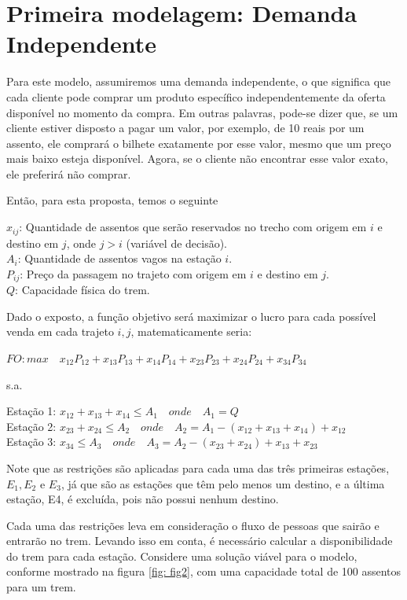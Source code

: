 \section{Primeira modelagem: Demanda Independente}\label{sec:modelo1}

Para este modelo, assumiremos uma demanda independente, o que significa que cada cliente pode comprar um produto específico independentemente da oferta disponível no momento da compra. Em outras palavras, pode-se dizer que, se um cliente estiver disposto a pagar um valor, por exemplo, de 10 reais por um assento, ele comprará o bilhete exatamente por esse valor, mesmo que um preço mais baixo esteja disponível. Agora, se o cliente não encontrar esse valor exato, ele preferirá não comprar.

Então, para esta proposta, temos o seguinte

\noindent $x_{ij}$: Quantidade de assentos que serão reservados no trecho com origem em $i$ e destino em $j$, onde $j>i$ (variável de decisão). \\
\noindent $A_i$: Quantidade de assentos vagos na estação $i$. \\
\noindent $P_{ij}$: Preço da passagem no trajeto com origem em $i$ e destino em $j$. \\
\noindent $Q$: Capacidade física do trem.

Dado o exposto, a função objetivo será maximizar o lucro para cada possível venda em cada trajeto $i,j$, matematicamente seria:

$FO: max \quad x_{12}P_{12} + x_{13}P_{13} + x_{14}P_{14} + x_{23}P_{23} + x_{24}P_{24} + x_{34}P_{34}$

s.a.

Estação 1: $x_{12} + x_{13} + x_{14} \leq A_1 \quad onde \quad A_1 = Q $ \\
\indent Estação 2: $x_{23} + x_{24}  \leq  A_2 \quad onde \quad A_2 = A_1 - (x_{12} + x_{13} + x_{14}) + x_{12} $ \\
\indent Estação 3: $x_{34} \leq A_3 \quad onde \quad A_3 = A_2 - (x_{23} + x_{24}) + x_{13} + x_{23} $

Note que as restrições são aplicadas para cada uma das três primeiras estações, $E_1, E_2$ e $E_3$, já que são as estações que têm pelo menos um destino, e a última estação, E4, é excluída, pois não possui nenhum destino.

Cada uma das restrições leva em consideração o fluxo de pessoas que sairão e entrarão no trem. Levando isso em conta, é necessário calcular a disponibilidade do trem para cada estação. Considere uma solução viável para o modelo, conforme mostrado na figura \ref{fig: fig2}, com uma capacidade total de 100 assentos para um trem.

